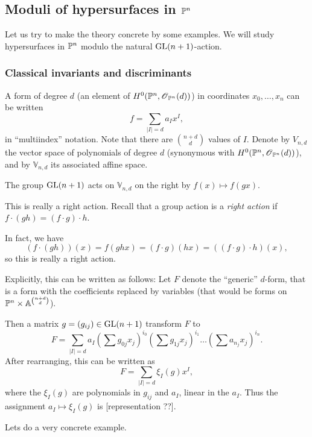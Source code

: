 \documentclass[11pt, english]{article}
\newcommand{\vnd}{\mathbb V_{n,d}}
\begin{document}
\subsection{Moduli of hypersurfaces in $\mathbb{P}^n$}

Let us try to make the theory concrete by some examples. We will study hypersurfaces in $\mathbb{P}^n$ modulo the natural $\operatorname{GL}(n+1)$-action.

\subsubsection{Classical invariants and discriminants}

A form of degree $d$ (an element of $H^0(\mathbb{P}^n,\operatorname{\mathscr{O}}_{\mathbb{P}^n}(d))$) in coordinates $x_0,\ldots,x_n$ can be written
\[
f = \sum_{\lvert I \rvert = d} a_I x^I,
\]
in ``multiindex'' notation. Note that there are $\binom{n+d}{d}$ values of $I$. Denote by $V_{n,d}$ the vector space of polynomials of degree $d$ (synonymous with $H^0(\mathbb{P}^n, \operatorname{\mathscr{O}}_{\mathbb{P}^n}(d))$), and by $\mathbb V_{n,d}$ its associated affine space.

The group $\operatorname{GL}(n+1)$ acts on $\vnd$ on the right by $f(x) \mapsto f(gx)$.
\begin{remark}
  This is really a right action. Recall that a group action is a \emph{right action} if $f \cdot (gh) = (f \cdot g) \cdot h$. 

In fact, we have $$(f \cdot (gh))(x) = f(ghx) = (f \cdot g)(hx) = ((f \cdot g) \cdot h)(x),$$
so this is really a right action.
\end{remark}

Explicitly, this can be written as follows: Let $F$ denote the ``generic'' $d$-form, that is a form with the coefficients replaced by variables (that would be forms on $\mathbb{P}^n \times \mathbb{A}^{\binom{n+d}{d}}$).

Then a matrix $g=(g_{ij}) \in \operatorname{GL}(n+1)$ transform $F$ to
\[
F = \sum_{\lvert I \rvert=d} a_I(\sum g_{0j}x_j)^{i_0}(\sum g_{1j}x_j)^{i_1} \ldots (\sum a_{n_j} x_j)^{i_n}.
\]
After rearranging, this can be written as
\[
F = \sum_{\lvert I \rvert = d} \xi_I(g) x^I,
\]
where the $\xi_I(g)$ are polynomials in $g_{ij}$ and $a_I$, linear in the $a_I$. Thus the assignment $a_I \mapsto \xi_I(g)$ is [representation ??].

Lets do a very concrete example.
\end{document}
